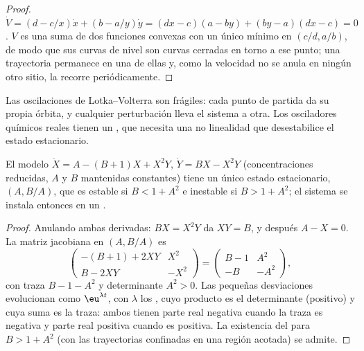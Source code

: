\begin{proof}
$\dot V = (d - c/x)\dot x + (b - a/y)\dot y = (dx - c)(a - by) + (by - a)(dx - c) = 0$. $V$ es una
suma de dos funciones convexas con un único mínimo en $(c/d, a/b)$, de modo que sus curvas
de nivel son curvas cerradas en torno a ese punto; una trayectoria permanece en una de
ellas y, como la velocidad no se anula en ningún otro sitio, la recorre periódicamente.
\end{proof}

Las oscilaciones de Lotka--Volterra son frágiles: cada punto de partida da su
propia órbita, y cualquier perturbación lleva el sistema a otra. Los osciladores químicos
reales tienen un , que necesita una no linealidad que desestabilice
el estado estacionario.

\begin{proposition}\label{prop:b3:complex-kinetics:hopf}
El modelo $\dot X = A - (B + 1)X + X^2Y$, $\dot Y = BX - X^2Y$ (concentraciones reducidas,
$A$ y $B$ mantenidas constantes) tiene un único estado estacionario, $(A, B/A)$, que es
estable si $B < 1 + A^2$ e inestable si $B > 1 + A^2$; el sistema se instala entonces en un
.
\end{proposition}

\begin{proof}
Anulando ambas derivadas: $BX = X^2Y$ da $XY = B$, y después $A - X = 0$. La
matriz jacobiana en $(A, B/A)$ es
\[
  \begin{pmatrix} -(B + 1) + 2XY & X^2 \\ B - 2XY & -X^2 \end{pmatrix}
  = \begin{pmatrix} B - 1 & A^2 \\ -B & -A^2 \end{pmatrix},
\]
con traza $B - 1 - A^2$ y determinante $A^2 > 0$. Las pequeñas desviaciones evolucionan como
$\eu^{\lambda t}$, con $\lambda$ los , cuyo producto es el determinante (positivo)
y cuya suma es la traza: ambos tienen parte real negativa cuando la traza es
negativa y parte real positiva cuando es positiva. La existencia del  para $B > 1 + A^2$ (con las trayectorias confinadas en una región acotada) se
admite.
\end{proof}

